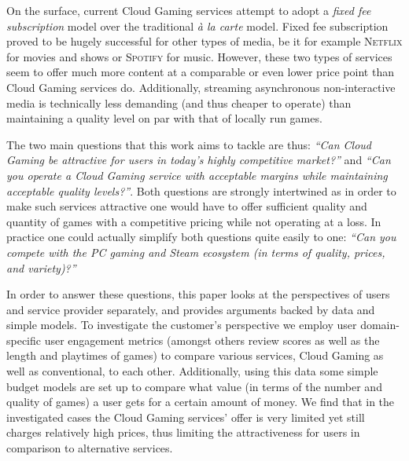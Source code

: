 On the surface, current Cloud Gaming services attempt to adopt a 
\textit{fixed fee subscription} model over the traditional 
\textit{à la carte} model. 
Fixed fee subscription proved to be hugely successful for other 
types of media, be 
it for example \textsc{Netflix} for movies and shows or 
\textsc{Spotify} for music. However, these two types of services seem 
to offer much more content at a comparable or even lower price point 
than Cloud Gaming services do. Additionally, streaming asynchronous 
non-interactive media is technically less demanding 
(and thus cheaper to operate) than 
maintaining a quality level on par with that of locally run games.

The two main questions that this work aims to tackle are thus: 
\textit{``Can Cloud Gaming be attractive for users in today's highly 
competitive market?''} and \textit{``Can you operate a Cloud Gaming 
service with acceptable margins while maintaining acceptable quality 
levels?''}. Both questions are strongly intertwined as in order to make 
such services attractive one would have to offer sufficient quality and 
quantity of games with a competitive pricing while not operating at a 
loss. In practice one could actually simplify both questions quite 
easily to one: \textit{``Can you compete with the PC gaming and Steam 
ecosystem (in terms of quality, prices, and variety)?''}

In order to answer these questions, this paper looks at the perspectives 
of users and service provider separately, and provides arguments backed 
by data and simple models. To investigate the customer's perspective we 
employ user domain-specific user engagement metrics (amongst others 
review scores as well as the length and playtimes of games) to 
compare various services, Cloud Gaming as well as conventional, 
to each other. Additionally, using this data some simple budget models 
are set up to compare what value (in terms of the number and quality of 
games) a user gets for a certain amount of money. 
We find that in the investigated 
cases the Cloud Gaming services' offer is very limited yet still 
charges relatively high prices, thus limiting the attractiveness for 
users in comparison to alternative services.

